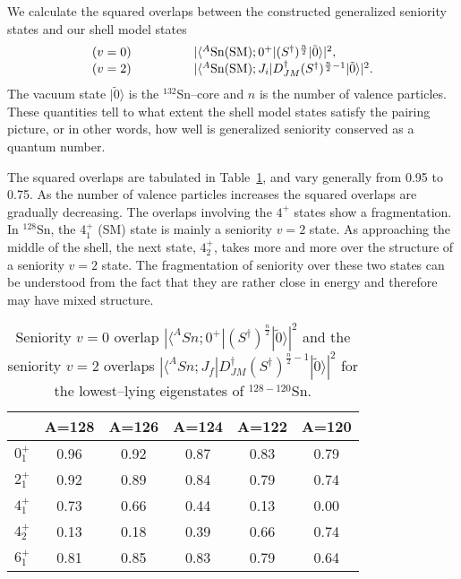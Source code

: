 We calculate the squared overlaps between the constructed generalized seniority
states and our shell model states
\begin{equation}
\begin{array}{lccccl}
(v=0) & & & & &
|\langle ^{A}{\rm Sn(SM)} ;
0^{+}|(S^{\dagger})^{\frac{n}{2}}| \tilde{0} \rangle |^{2}, \\
(v=2) & & & & &
|\langle ^{A}{\rm Sn(SM)} ;
J_{i}|D^{\dagger}_{JM}(S^{\dagger})^{\frac{n}{2}-1}| \tilde{0} \rangle |^{2}. 
\end{array}
\end{equation}
The vacuum state $|\tilde{0} \rangle $ is the $^{132}$Sn--core and $n$ is
the number of valence particles. These quantities tell to what extent the 
shell model states satisfy the pairing picture, or in other words, how well 
is generalized seniority conserved as a quantum number.

The squared overlaps are tabulated in Table~\ref{tab:seniority}, and vary
generally from 0.95 to 0.75. As the number of valence particles increases the 
squared overlaps are gradually decreasing. The overlaps involving the $4^{+}$
states show a fragmentation. In $^{128}$Sn, the $4^{+}_{1}$ (SM)
state is mainly a seniority $v=2$ state. As approaching the middle of the 
shell, the next state, $4^{+}_{2}$, takes more and more over the 
structure of a seniority $v=2$ state. The fragmentation of seniority over these
two states can be understood from the fact that they are rather close in 
energy and therefore may have mixed structure.

\begin{table}[htbp]
\begin{center}
\begin{tabular}{cccccc}
\hline
 & A=128 & A=126 & A=124 & A=122 & A=120 \\ 
\hline
$0^{+}_{1}$ & 0.96 & 0.92 & 0.87 & 0.83 & 0.79 \\ 
$2^{+}_{1}$ & 0.92 & 0.89 & 0.84 & 0.79 & 0.74 \\ 
$4^{+}_{1}$ & 0.73 & 0.66 & 0.44 & 0.13 & 0.00 \\ 
$4^{+}_{2}$ & 0.13 & 0.18 & 0.39 & 0.66 & 0.74 \\
$6^{+}_{1}$ & 0.81 & 0.85 & 0.83 & 0.79 & 0.64 \\
\hline
\end{tabular}
\caption{ Seniority $v=0$ overlap 
         $|\langle ^{A}Sn;0^{+}|(S^{\dagger})^{\frac{n}{2}}| 
         \tilde{0} \rangle |^{2}$ and the seniority $v=2$ 
         overlaps $|\langle ^{A}Sn ;J_{f}|
         D^{\dagger}_{JM}(S^{\dagger})^{\frac{n}{2} - 1}| 
         \tilde{0} \rangle |^{2}$ for the lowest--lying eigenstates 
         of $^{128-120}$Sn.}
\label{tab:seniority}
\end{center}
\end{table}

